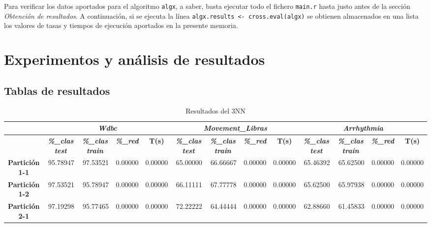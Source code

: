 \documentclass[a4paper,11pt]{article}
\begin{document}
 Para verificar los datos aportados para el algoritmo \texttt{algx}, a saber, basta ejecutar todo el fichero \texttt{main.r}
 hasta justo antes de la sección \textit{Obtención de resultados}. A continuación, si se ejecuta la línea 
 \texttt{algx.results <- cross.eval(algx)} se obtienen almacenados en una lista los valores de tasas y tiempos de ejecución
 aportados en la presente memoria.
 
 \section{Experimentos y análisis de resultados}
 \subsection{Tablas de resultados}
 \begin{table}[H]	
    \caption*{Resultados del 3NN}
    \begin{adjustbox}{width=1.1\textwidth}
    \begin{tabular}{|c|r|r|r|r|r|r|r|r|r|r|r|r|}
    \hline
    \multicolumn{1}{|l|}{} & \multicolumn{ 4}{c|}{\textbf{\textit{Wdbc}}} & \multicolumn{ 4}{c|}{\textbf{\textit{Movement\_Libras}}} & \multicolumn{ 4}{c|}{\textbf{\textit{Arrhythmia}}} \\ \hline
    & \multicolumn{1}{c|}{\textbf{\textit{\%\_clas test}}} & \multicolumn{1}{c|}{\textbf{\textit{\%\_clas train}}} & \multicolumn{1}{c|}{\textbf{\textit{\%\_red}}} & \multicolumn{1}{c|}{\textbf{T(s)}} & \multicolumn{1}{c|}{\textbf{\textit{\%\_clas test}}} & \multicolumn{1}{c|}{\textbf{\textit{\%\_clas train}}} & \multicolumn{1}{c|}{\textbf{\textit{\%\_red}}} & \multicolumn{1}{c|}{\textbf{T(s)}} & \multicolumn{1}{c|}{\textbf{\textit{\%\_clas test}}} & \multicolumn{1}{c|}{\textbf{\textit{\%\_clas train}}} & \multicolumn{1}{c|}{\textbf{\textit{\%\_red}}} & \multicolumn{1}{c|}{\textbf{T(s)}} \\ \hline
    \textbf{Partición 1-1} & 95.78947 & 97.53521 & 0.00000 & 0.00000 & 65.00000 & 66.66667 & 0.00000 & 0.00000 & 65.46392 & 65.62500 & 0.00000 & 0.00000 \\ \hline
    \textbf{Partición 1-2} & 97.53521 & 95.78947 & 0.00000 & 0.00000 & 66.11111 & 67.77778 & 0.00000 & 0.00000 & 65.62500 & 65.97938 & 0.00000 & 0.00000 \\ \hline
    \textbf{Partición 2-1} & 97.19298 & 95.77465 & 0.00000 & 0.00000 & 72.22222 & 64.44444 & 0.00000 & 0.00000 & 62.88660 & 61.45833 & 0.00000 & 0.00000 \\ \hline

\end{tabular}
\end{adjustbox}
\end{table}
\end{document}
